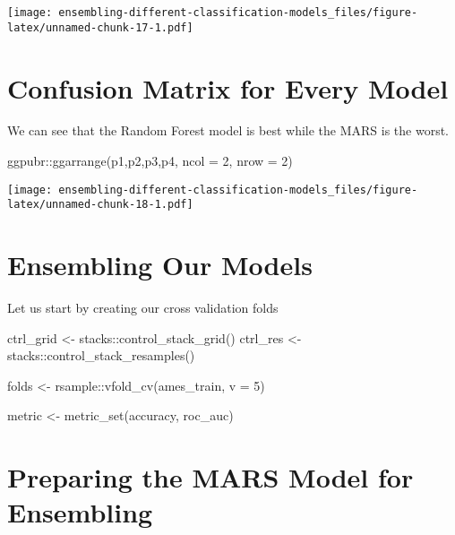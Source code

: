\documentclass[
]{article}
\newenvironment{Shaded}{\begin{snugshade}}{\end{snugshade}}
\newcommand{\AttributeTok}[1]{\textcolor[rgb]{0.77,0.63,0.00}{#1}}
\newcommand{\DecValTok}[1]{\textcolor[rgb]{0.00,0.00,0.81}{#1}}
\newcommand{\FunctionTok}[1]{\textcolor[rgb]{0.00,0.00,0.00}{#1}}
\newcommand{\NormalTok}[1]{#1}
\newcommand{\OtherTok}[1]{\textcolor[rgb]{0.56,0.35,0.01}{#1}}
\newcommand{\SpecialCharTok}[1]{\textcolor[rgb]{0.00,0.00,0.00}{#1}}
\begin{document}
\texttt{[image: ensembling-different-classification-models\_files/figure-latex/unnamed-chunk-17-1.pdf]}

\hypertarget{confusion-matrix-for-every-model}{%
\section{Confusion Matrix for Every
Model}\label{confusion-matrix-for-every-model}}

We can see that the Random Forest model is best while the MARS is the
worst.

\begin{Shaded}
\begin{Highlighting}[]
\NormalTok{ggpubr}\SpecialCharTok{::}\FunctionTok{ggarrange}\NormalTok{(p1,p2,p3,p4,}
                   \AttributeTok{ncol =} \DecValTok{2}\NormalTok{,}
                   \AttributeTok{nrow =} \DecValTok{2}\NormalTok{)}
\end{Highlighting}
\end{Shaded}

\texttt{[image: ensembling-different-classification-models\_files/figure-latex/unnamed-chunk-18-1.pdf]}

\hypertarget{ensembling-our-models}{%
\section{Ensembling Our Models}\label{ensembling-our-models}}

Let us start by creating our cross validation folds

\begin{Shaded}
\begin{Highlighting}[]
\NormalTok{ctrl\_grid }\OtherTok{\textless{}{-}}\NormalTok{ stacks}\SpecialCharTok{::}\FunctionTok{control\_stack\_grid}\NormalTok{()}
\NormalTok{ctrl\_res }\OtherTok{\textless{}{-}}\NormalTok{ stacks}\SpecialCharTok{::}\FunctionTok{control\_stack\_resamples}\NormalTok{()}

\NormalTok{folds }\OtherTok{\textless{}{-}}\NormalTok{ rsample}\SpecialCharTok{::}\FunctionTok{vfold\_cv}\NormalTok{(ames\_train, }\AttributeTok{v =} \DecValTok{5}\NormalTok{)}

\NormalTok{metric }\OtherTok{\textless{}{-}} \FunctionTok{metric\_set}\NormalTok{(accuracy, roc\_auc)}
\end{Highlighting}
\end{Shaded}

\hypertarget{preparing-the-mars-model-for-ensembling}{%
\section{Preparing the MARS Model for
Ensembling}\label{preparing-the-mars-model-for-ensembling}}
\end{document}
